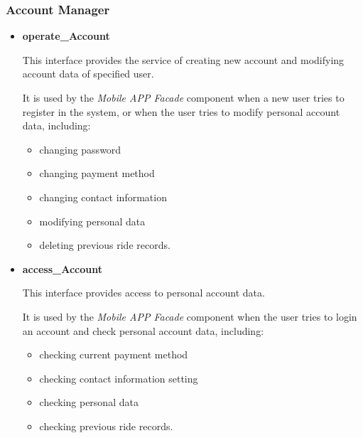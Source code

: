 \documentclass[a4paper,11pt]{article}
\begin{document}
		\subsubsection{Account Manager}
			\begin{itemize}
				\item \textbf{operate\_Account}

This interface provides the service of creating new account and modifying account data of specified user.

It is used by the \textsl{Mobile APP Facade} component when a new user tries to register in the system, or when the user tries to modify personal account data, including:
					\begin{itemize}
						\item changing password
						\item changing payment method
						\item changing contact information
						\item modifying personal data
						\item deleting previous ride records.
					\end{itemize}
					
				\item \textbf{access\_Account}

This interface provides access to personal account data.

It is used by the \textsl{Mobile APP Facade} component when the user tries to login an account and check personal account data, including:
					\begin{itemize}
						\item checking current payment method
						\item checking contact information setting
						\item checking personal data
						\item checking previous ride records.
					\end{itemize}
			\end{itemize}
			
\end{document}
